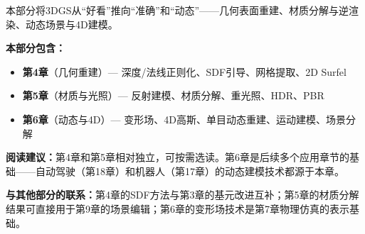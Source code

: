 \vspace{1em}
\begin{center}
\textcolor{techgray}{\small 本部分将3DGS从``好看''推向``准确''和``动态''——几何表面重建、材质分解与逆渲染、动态场景与4D建模。}
\end{center}
\vspace{0.5em}

\noindent\textbf{本部分包含：}
\begin{itemize}[leftmargin=2em,itemsep=1pt]
\item[\textcolor{techgreen}{\textbullet}] \textbf{第4章}（几何重建）— 深度/法线正则化、SDF引导、网格提取、2D Surfel
\item[\textcolor{techgreen}{\textbullet}] \textbf{第5章}（材质与光照）— 反射建模、材质分解、重光照、HDR、PBR
\item[\textcolor{techgreen}{\textbullet}] \textbf{第6章}（动态与4D）— 变形场、4D高斯、单目动态重建、运动建模、场景分解
\end{itemize}

\noindent\textbf{阅读建议：}第4章和第5章相对独立，可按需选读。第6章是后续多个应用章节的基础——自动驾驶（第18章）和机器人（第17章）的动态建模技术都源于本章。

\noindent\textbf{与其他部分的联系：}第4章的SDF方法与第3章的基元改进互补；第5章的材质分解结果可直接用于第9章的场景编辑；第6章的变形场技术是第7章物理仿真的表示基础。

\vspace{1em}
